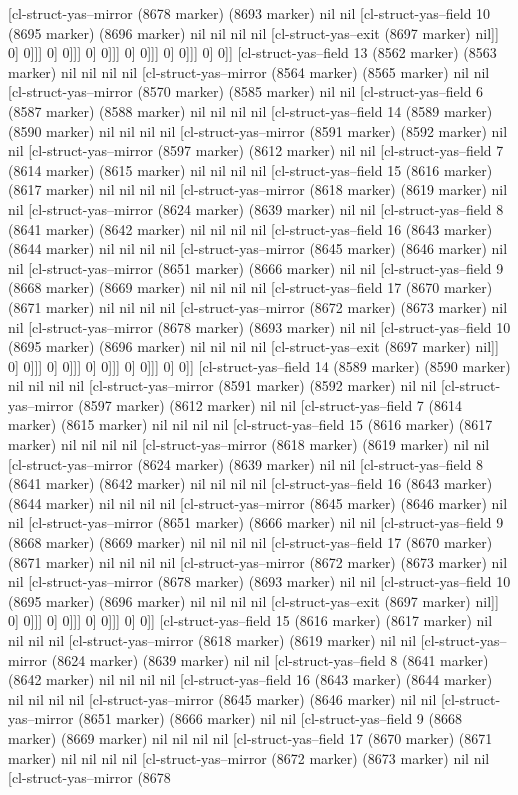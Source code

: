 {{[cl-struct-yas--mirror (8678 marker) (8693 marker) nil nil [cl-struct-yas--field 10 (8695 marker) (8696 marker) nil nil nil nil [cl-struct-yas--exit (8697 marker) nil]] 0] 0]]] 0] 0]]] 0] 0]]] 0] 0]]] 0] 0]]] 0] 0]] [cl-struct-yas--field 13 (8562 marker) (8563 marker) nil nil nil nil [cl-struct-yas--mirror (8564 marker) (8565 marker) nil nil [cl-struct-yas--mirror (8570 marker) (8585 marker) nil nil [cl-struct-yas--field 6 (8587 marker) (8588 marker) nil nil nil nil [cl-struct-yas--field 14 (8589 marker) (8590 marker) nil nil nil nil [cl-struct-yas--mirror (8591 marker) (8592 marker) nil nil [cl-struct-yas--mirror (8597 marker) (8612 marker) nil nil [cl-struct-yas--field 7 (8614 marker) (8615 marker) nil nil nil nil [cl-struct-yas--field 15 (8616 marker) (8617 marker) nil nil nil nil [cl-struct-yas--mirror (8618 marker) (8619 marker) nil nil [cl-struct-yas--mirror (8624 marker) (8639 marker) nil nil [cl-struct-yas--field 8 (8641 marker) (8642 marker) nil nil nil nil [cl-struct-yas--field 16 (8643 marker) (8644 marker) nil nil nil nil [cl-struct-yas--mirror (8645 marker) (8646 marker) nil nil [cl-struct-yas--mirror (8651 marker) (8666 marker) nil nil [cl-struct-yas--field 9 (8668 marker) (8669 marker) nil nil nil nil [cl-struct-yas--field 17 (8670 marker) (8671 marker) nil nil nil nil [cl-struct-yas--mirror (8672 marker) (8673 marker) nil nil [cl-struct-yas--mirror (8678 marker) (8693 marker) nil nil [cl-struct-yas--field 10 (8695 marker) (8696 marker) nil nil nil nil [cl-struct-yas--exit (8697 marker) nil]] 0] 0]]] 0] 0]]] 0] 0]]] 0] 0]]] 0] 0]] [cl-struct-yas--field 14 (8589 marker) (8590 marker) nil nil nil nil [cl-struct-yas--mirror (8591 marker) (8592 marker) nil nil [cl-struct-yas--mirror (8597 marker) (8612 marker) nil nil [cl-struct-yas--field 7 (8614 marker) (8615 marker) nil nil nil nil [cl-struct-yas--field 15 (8616 marker) (8617 marker) nil nil nil nil [cl-struct-yas--mirror (8618 marker) (8619 marker) nil nil [cl-struct-yas--mirror (8624 marker) (8639 marker) nil nil [cl-struct-yas--field 8 (8641 marker) (8642 marker) nil nil nil nil [cl-struct-yas--field 16 (8643 marker) (8644 marker) nil nil nil nil [cl-struct-yas--mirror (8645 marker) (8646 marker) nil nil [cl-struct-yas--mirror (8651 marker) (8666 marker) nil nil [cl-struct-yas--field 9 (8668 marker) (8669 marker) nil nil nil nil [cl-struct-yas--field 17 (8670 marker) (8671 marker) nil nil nil nil [cl-struct-yas--mirror (8672 marker) (8673 marker) nil nil [cl-struct-yas--mirror (8678 marker) (8693 marker) nil nil [cl-struct-yas--field 10 (8695 marker) (8696 marker) nil nil nil nil [cl-struct-yas--exit (8697 marker) nil]] 0] 0]]] 0] 0]]] 0] 0]]] 0] 0]] [cl-struct-yas--field 15 (8616 marker) (8617 marker) nil nil nil nil [cl-struct-yas--mirror (8618 marker) (8619 marker) nil nil [cl-struct-yas--mirror (8624 marker) (8639 marker) nil nil [cl-struct-yas--field 8 (8641 marker) (8642 marker) nil nil nil nil [cl-struct-yas--field 16 (8643 marker) (8644 marker) nil nil nil nil [cl-struct-yas--mirror (8645 marker) (8646 marker) nil nil [cl-struct-yas--mirror (8651 marker) (8666 marker) nil nil [cl-struct-yas--field 9 (8668 marker) (8669 marker) nil nil nil nil [cl-struct-yas--field 17 (8670 marker) (8671 marker) nil nil nil nil [cl-struct-yas--mirror (8672 marker) (8673 marker) nil nil [cl-struct-yas--mirror (8678 }}

